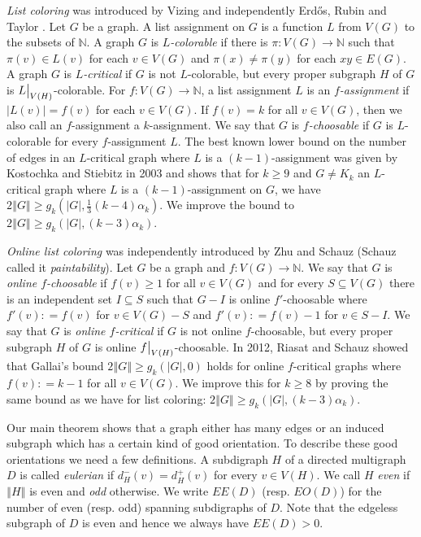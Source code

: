 \documentclass[12pt]{article}
\theoremstyle{plain}
\theoremstyle{definition}
\theoremstyle{remark}
\newcommand{\IN}{\mathbb{N}}
\newcommand{\card}[1]{\left|#1\right|}
\newcommand{\size}[1]{\left\Vert#1\right\Vert}
\newcommand{\func}[3]{#1\colon #2 \rightarrow #3}
\newcommand{\DefinedAs}{\mathrel{\mathop:}=}
\newcommand\restr[2]{{%
  \left.\kern-\nulldelimiterspace %
  #1 %
  \vphantom{\big|} %
  \right|_{#2} %
  }}
\begin{document}
\emph{List coloring} was introduced by Vizing \cite{vizing1976} and independently Erd\H{o}s, Rubin and Taylor \cite{erdos1979choosability}.  Let $G$ be a graph. A list assignment on $G$ is a function $L$ from $V(G)$ to the subsets of $\IN$.   A graph $G$ is \emph{$L$-colorable} if there is $\func{\pi}{V(G)}{\IN}$ such that $\pi(v) \in L(v)$ for each $v \in V(G)$ and $\pi(x) \neq \pi(y)$ for each $xy \in E(G)$.   A graph $G$ is \emph{$L$-critical} if $G$ is not $L$-colorable, but every proper subgraph $H$ of $G$ is $\restr{L}{V(H)}$-colorable. For $\func{f}{V(G)}{\IN}$, a list assignment $L$ is an \emph{$f$-assignment} if $\card{L(v)} = f(v)$ for each $v \in V(G)$.  If $f(v) = k$ for all $v \in V(G)$, then we also call an $f$-assignment a $k$-assignment.  We say that $G$ is \emph{$f$-choosable} if $G$ is $L$-colorable for every $f$-assignment $L$.  The best known lower bound on the number of edges in an $L$-critical graph where $L$ is a $(k-1)$-assignment was given by Kostochka and Stiebitz \cite{kostochkastiebitzedgesincriticalgraph} in 2003 and shows that for $k \geq 9$ and $G \neq K_k$ an $L$-critical graph where $L$ is a $(k-1)$-assignment on $G$, we have $2\size{G} \geq g_k(\card{G}, \frac13 (k-4)\alpha_k)$.  We improve the bound to $2\size{G} \geq g_k(\card{G}, (k-3)\alpha_k)$.

\emph{Online list coloring} was independently introduced by Zhu \cite{zhu2009online} and Schauz \cite{schauz2009mr} (Schauz called it \emph{paintability}). Let $G$ be a graph and $\func{f}{V(G)}{\IN}$.  We say that $G$ is \emph{online $f$-choosable} if $f(v) \geq 1$ for all $v \in V(G)$ and for every $S \subseteq V(G)$ there is an independent set $I \subseteq S$ such that $G-I$ is online $f'$-choosable where $f'(v) \DefinedAs f(v)$ for $v \in V(G) - S$ and $f'(v) \DefinedAs f(v) - 1$ for $v \in S - I$.  We say that $G$ is \emph{online $f$-critical} if $G$ is not online $f$-choosable, but every proper subgraph $H$ of $G$ is online $\restr{f}{V(H)}$-choosable.  In 2012, Riasat and Schauz \cite{riasat2012critically} showed that Gallai's bound  $2\size{G} \geq g_k(\card{G}, 0)$ holds for online $f$-critical graphs where $f(v) \DefinedAs k-1$ for all $v \in V(G)$.  We improve this for $k \geq 8$ by proving the same bound as we have for list coloring: $2\size{G} \geq g_k(\card{G}, (k-3)\alpha_k)$.

Our main theorem shows that a graph either has many edges or an induced subgraph which has a certain kind of good orientation.  To describe these good orientations we need a few definitions. A subdigraph $H$ of a directed multigraph $D$ is called \emph{eulerian} if $d^-_H(v) = d^+_H(v)$ for every $v \in V(H)$.  We call $H$ \emph{even} if $\size{H}$ is even and \emph{odd} otherwise.  We write $EE(D)$ (resp. $EO(D)$) for the number of even (resp. odd) spanning subdigraphs of $D$.  Note that the edgeless subgraph of $D$ is even and hence we always have $EE(D) > 0$.
\end{document}
